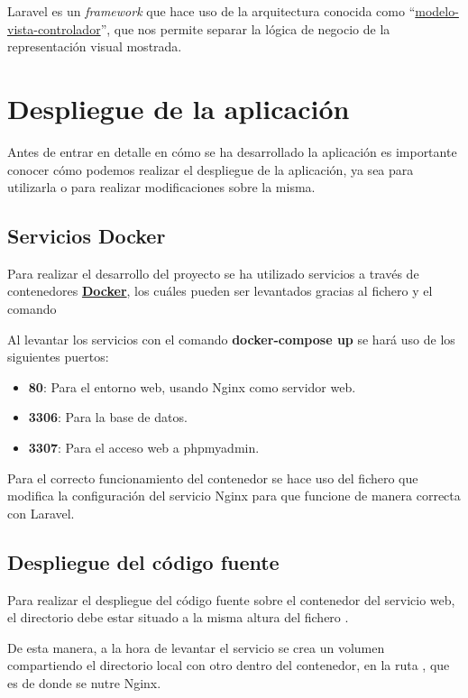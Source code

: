 \documentclass{\ClassPath/viu-tfm-template}
\begin{document}
Laravel es un \textit{framework} que hace uso de la arquitectura conocida como “\href{https://es.wikipedia.org/wiki/Modelo%E2%80%93vista%E2%80%93controlador}{modelo-vista-controlador}”, que nos permite separar la lógica de negocio de la representación visual mostrada.


\chapter{Despliegue de la aplicación}
Antes de entrar en detalle en cómo se ha desarrollado la aplicación es importante conocer cómo podemos realizar el despliegue de la aplicación, ya sea para utilizarla o para realizar modificaciones sobre la misma.

\section{Servicios Docker}
Para realizar el desarrollo del proyecto se ha utilizado servicios a través de contenedores \textbf{\href{https://www.docker.com/}{Docker}}, los cuáles pueden ser levantados gracias al fichero  y el comando 

Al levantar los servicios con el comando \textbf{docker-compose up} se hará uso de los siguientes puertos:
\vspace{-1em}
\begin{itemize}
    \item \textbf{80}: Para el entorno web, usando Nginx como servidor web.
    \item \textbf{3306}: Para la base de datos.
    \item \textbf{3307}: Para el acceso web a phpmyadmin.
\end{itemize}
\vspace{-1em}

Para el correcto funcionamiento del contenedor se hace uso del fichero  que modifica la configuración del servicio Nginx para que funcione de manera correcta con Laravel.

\section{Despliegue del código fuente}
Para realizar el despliegue del código fuente sobre el contenedor del servicio web, el directorio  debe estar situado a la misma altura del fichero .

De esta manera, a la hora de levantar el servicio se crea un volumen compartiendo el directorio local  con otro dentro del contenedor, en la ruta , que es de donde se nutre Nginx.
\end{document}
